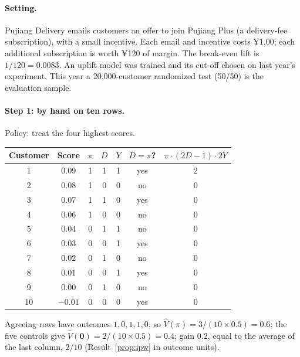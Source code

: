 \documentclass[11pt]{article}
\begin{document}
\paragraph{Setting.} Pujiang Delivery emails customers an offer to join Pujiang Plus (a delivery-fee subscription), with a
small incentive. Each email and incentive costs ¥1.00; each additional subscription is worth ¥120 of margin.
The break-even lift is $1/120 = 0.0083$. An uplift model was trained and its cut-off chosen on last year's experiment. This
year a 20{,}000-customer randomized test (50/50) is the evaluation sample.

\paragraph{Step 1: by hand on ten rows.} Policy: treat the four highest scores.
\begin{center}
\begin{tabular}{ccccccc}
\toprule
Customer & Score & $\pi$ & $D$ & $Y$ & $D = \pi$? & $\pi \cdot (2D-1)\cdot 2Y$ \\
\midrule
1 & 0.09 & 1 & 1 & 1 & yes & 2 \\
2 & 0.08 & 1 & 0 & 0 & no & 0 \\
3 & 0.07 & 1 & 1 & 0 & yes & 0 \\
4 & 0.06 & 1 & 0 & 0 & no & 0 \\
5 & 0.04 & 0 & 1 & 1 & no & 0 \\
6 & 0.03 & 0 & 0 & 1 & yes & 0 \\
7 & 0.02 & 0 & 1 & 0 & no & 0 \\
8 & 0.01 & 0 & 0 & 1 & yes & 0 \\
9 & 0.00 & 0 & 1 & 0 & no & 0 \\
10 & $-0.01$ & 0 & 0 & 0 & yes & 0 \\
\bottomrule
\end{tabular}
\end{center}
Agreeing rows have outcomes $1, 0, 1, 1, 0$, so $\hat V(\pi) = 3/(10 \times 0.5) = 0.6$; the five controls give
$\hat V(\mathbf 0) = 2/(10 \times 0.5) = 0.4$; gain $0.2$, equal to the average of the last column, $2/10$
(Result~\ref{prop:ipw} in outcome units).
\end{document}
